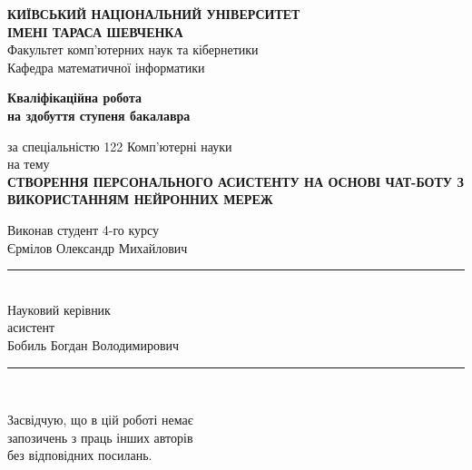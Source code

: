 \thispagestyle{empty}
\begin{SingleSpacing}

 \begin{center}
  {\textbf{
    КИЇВСЬКИЙ НАЦІОНАЛЬНИЙ УНІВЕРСИТЕТ\\
    ІМЕНІ ТАРАСА ШЕВЧЕНКА\\}
   Факультет комп'ютерних наук та кібернетики\\
   Кафедра математичної інформатики\\}
 \end{center}

 \vspace{6mm}

 \begin{center}
  \color{black}
  \large
  \textbf{Кваліфікаційна робота\\
   на здобуття ступеня бакалавра}\\
  \begin{OnehalfSpacing}
   за спеціальністю 122 Комп'ютерні науки \\
   на тему\\
   \textbf{СТВОРЕННЯ ПЕРСОНАЛЬНОГО АСИСТЕНТУ НА ОСНОВІ ЧАТ-БОТУ З ВИКОРИСТАННЯМ НЕЙРОННИХ МЕРЕЖ }
  \end{OnehalfSpacing}
 \end{center}

 \vspace{5mm}

 \begin{flushleft}
  Виконав студент 4-го курсу\\
  Єрмілов Олександр Михайлович \hfill \rule{4cm}{1pt} \\
  \vspace{0.5cm}
  Науковий керівник\\
  асистент\\
  Бобиль Богдан Володимирович  \hfill   \rule {4cm}{1pt} \\


 \end{flushleft}
 \vspace{5mm}

 \begin{flushright}
  \begin{minipage}{.52\linewidth}
   Засвідчую, що в цій роботі немає \\
   запозичень з праць інших авторів \\
   без відповідних   посилань.
   \vspace{0.3cm}


\end{minipage}
\end{flushright}
\end{SingleSpacing}
